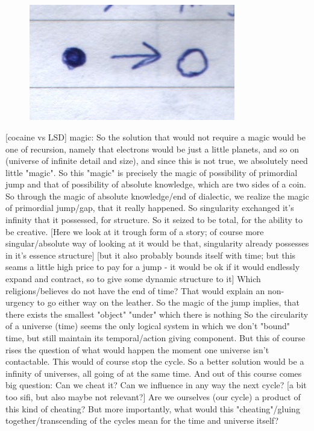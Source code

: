 \documentclass[10pt]{book}
\begin{document}
\begin{figure}[ht!]
\centering
\includegraphics[width=90mm]{scan05.jpg}
\label{overflow}
\end{figure}

[cocaine vs LSD]
magic:
So the solution that would not require a magic would be one of recursion, namely that electrons would be just a little planets, and so on (universe of infinite detail and size), and since this is not true, we absolutely need little "magic". So this "magic" is precisely the magic of possibility of primordial jump and that of possibility of absolute knowledge, which are two sides of a coin. So through the magic of absolute knowledge/end of dialectic, we realize the magic of primordial jump/gap, that it really happened. So singularity exchanged it's infinity that it possessed, for structure. So it seized to be total, for the ability to be creative. [Here we look at it trough form of a story; of course more singular/absolute way of looking at it would be that, singularity already possesses in it's essence structure] [but it also probably bounds itself with time; but this seams a little high price to pay for a jump - it would be ok if it would endlessly expand and contract, so to give some dynamic structure to it]
Which religions/believes do not have the end of time? That would explain an non-urgency to go either way on the leather.
So the magic of the jump implies, that there exists the smallest "object" "under" which there is nothing
So the circularity of a universe (time) seems the only logical system in which we don't "bound" time, but still maintain its temporal/action giving component.
But this of course rises the question of what would happen the moment one universe isn't contactable. This would of course stop the cycle. So a better solution would be a infinity of universes, all going of at the same time.
And out of this course comes big question: Can we cheat it? Can we influence in any way the next cycle? [a bit too sifi, but also maybe not relevant?] Are we ourselves (our cycle) a product of this kind of cheating? But more importantly, what would this "cheating"/gluing together/transcending of the cycles mean for the time and universe itself?
\end{document}
